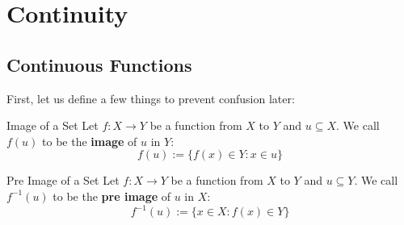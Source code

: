 \section{Continuity}
\subsection{Continuous Functions}
First, let us define a few things to prevent confusion later:
\begin{defn}{Image of a Set}{}
Let \(f: X\to Y\) be a function from \(X\) to \(Y\) and \(u \subseteq X\). We call \(f(u)\) to be the \textbf{image} of \(u\) in \(Y\):
\begin{equation*}
  f(u) := \{f(x) \in Y : x \in u\}
\end{equation*}
\end{defn}

\begin{defn}{Pre Image of a Set}{}
Let \(f: X\to Y\) be a function from \(X\) to \(Y\) and \(u \subseteq Y\). We call \(f^{-1}(u)\) to be the \textbf{pre image} of \(u\) in \(X\):
\begin{equation*}
  f^{-1}(u) := \{x \in X : f(x) \in Y\}
\end{equation*}
\end{defn}


